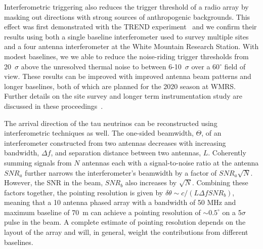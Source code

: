 \documentclass{PoS}
\begin{document}
Interferometric triggering also reduces the trigger threshold of a radio array by masking out directions with strong sources of anthropogenic backgrounds. This effect was first demonstrated with the TREND experiment~\cite{TREND} and we confirm their results using both a single baseline interferometer used to survey multiple sites and a four antenna interferometer at the White Mountain Research Station. With modest baselines, we we able to reduce the noise-riding trigger thresholds from 20~$\sigma$ above the unresolved thermal noise to between 6-10~$\sigma$ over a 60$^{\circ}$ field of view. These results can be improved with improved antenna beam patterns and longer baselines, both of which are planned for the 2020 season at WMRS. Further details on the site survey and longer term instrumentation study are discussed in these proceedings~\cite{ICRC_BEACON_prototype}. 

The arrival direction of the tau neutrinos can be reconstructed using interferometric techniques as well. The one-sided beamwidth, $\Theta$, of an interferometer constructed from two antennas decreases with increasing bandwidth, $\Delta f$, and separation distance between two antennas, $L$. Coherently summing signals from $N$ antennas each with a signal-to-noise ratio at the antenna $SNR_{a}$ further narrows the interferometer's beamwidth by a factor of $SNR_{a} \sqrt{N} $. However, the SNR in the beam, $SNR_b$ also increases by $\sqrt{N}$. Combining these factors together, the pointing resolution is given by $\delta\theta \sim c/(L \Delta f SNR_b)$, meaning that a 10 antenna phased array with a bandwidth of 50 MHz and maximum baseline of 70~m can achieve a pointing resolution of $\sim0.5^{\circ}$ on a 5$\sigma$ pulse in the beam. A complete estimate of pointing resolution depends on the layout of the array and will, in general, weight the contributions from different baselines. 

\end{document}
